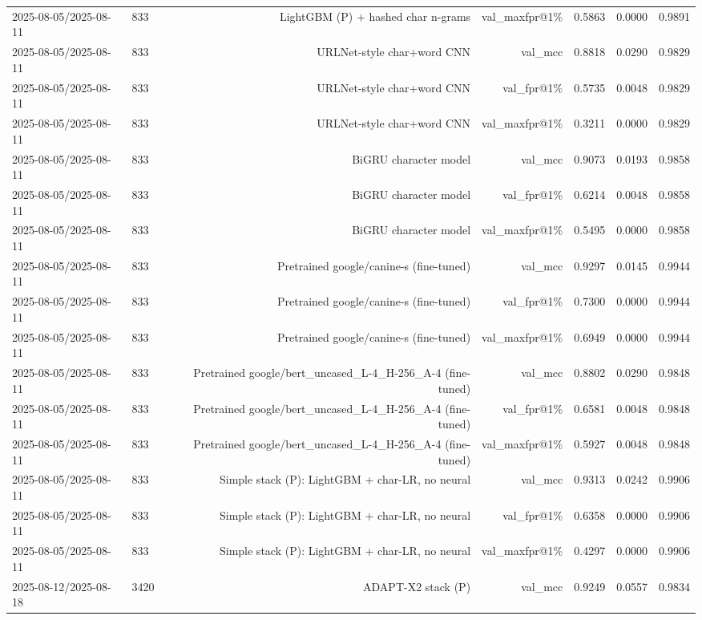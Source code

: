 \begin{table}[t]
\begin{tabular}{llrrrrr}
2025-08-05/2025-08-11 & 833 & LightGBM (P) + hashed char n-grams & val\_maxfpr@1\% & 0.5863 & 0.0000 & 0.9891 \\
2025-08-05/2025-08-11 & 833 & URLNet-style char+word CNN & val\_mcc & 0.8818 & 0.0290 & 0.9829 \\
2025-08-05/2025-08-11 & 833 & URLNet-style char+word CNN & val\_fpr@1\% & 0.5735 & 0.0048 & 0.9829 \\
2025-08-05/2025-08-11 & 833 & URLNet-style char+word CNN & val\_maxfpr@1\% & 0.3211 & 0.0000 & 0.9829 \\
2025-08-05/2025-08-11 & 833 & BiGRU character model & val\_mcc & 0.9073 & 0.0193 & 0.9858 \\
2025-08-05/2025-08-11 & 833 & BiGRU character model & val\_fpr@1\% & 0.6214 & 0.0048 & 0.9858 \\
2025-08-05/2025-08-11 & 833 & BiGRU character model & val\_maxfpr@1\% & 0.5495 & 0.0000 & 0.9858 \\
2025-08-05/2025-08-11 & 833 & Pretrained google/canine-s (fine-tuned) & val\_mcc & 0.9297 & 0.0145 & 0.9944 \\
2025-08-05/2025-08-11 & 833 & Pretrained google/canine-s (fine-tuned) & val\_fpr@1\% & 0.7300 & 0.0000 & 0.9944 \\
2025-08-05/2025-08-11 & 833 & Pretrained google/canine-s (fine-tuned) & val\_maxfpr@1\% & 0.6949 & 0.0000 & 0.9944 \\
2025-08-05/2025-08-11 & 833 & Pretrained google/bert\_uncased\_L-4\_H-256\_A-4 (fine-tuned) & val\_mcc & 0.8802 & 0.0290 & 0.9848 \\
2025-08-05/2025-08-11 & 833 & Pretrained google/bert\_uncased\_L-4\_H-256\_A-4 (fine-tuned) & val\_fpr@1\% & 0.6581 & 0.0048 & 0.9848 \\
2025-08-05/2025-08-11 & 833 & Pretrained google/bert\_uncased\_L-4\_H-256\_A-4 (fine-tuned) & val\_maxfpr@1\% & 0.5927 & 0.0048 & 0.9848 \\
2025-08-05/2025-08-11 & 833 & Simple stack (P): LightGBM + char-LR, no neural & val\_mcc & 0.9313 & 0.0242 & 0.9906 \\
2025-08-05/2025-08-11 & 833 & Simple stack (P): LightGBM + char-LR, no neural & val\_fpr@1\% & 0.6358 & 0.0000 & 0.9906 \\
2025-08-05/2025-08-11 & 833 & Simple stack (P): LightGBM + char-LR, no neural & val\_maxfpr@1\% & 0.4297 & 0.0000 & 0.9906 \\
2025-08-12/2025-08-18 & 3420 & ADAPT-X2 stack (P) & val\_mcc & 0.9249 & 0.0557 & 0.9834 \\

\end{tabular}
\end{table}
